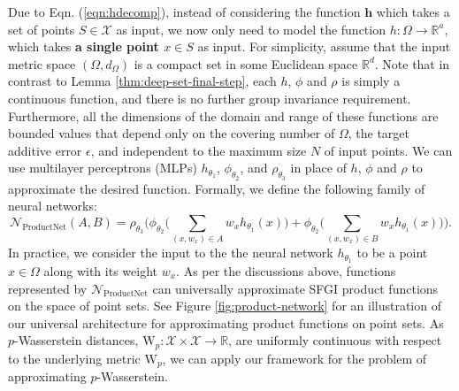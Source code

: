 \documentclass[12pt]{article}
\newcommand{\R}{\mathbb R}
\newcommand{\Network}{\mathcal{N}_{\mathrm{ProductNet}}}
\newcommand{\SFGI} {{SFGI}}
\begin{document}
Due to Eqn. (\ref{eqn:hdecomp}), instead of considering the function $\mathbf{h}$ which takes a set of points $S \in \mathcal{X}$ as input, we now only need to model the function $h: \Omega \to \R^a$, which takes {\bf a single point $x\in S$} as input. 
For simplicity, assume that the input metric space $(\Omega, d_\Omega)$ is a compact set in some Euclidean space $\R^d$. 
Note that in contrast to Lemma \ref{thm:deep-set-final-step}, each $h$, $\phi$ and $\rho$ is simply a continuous function, and there is no further group invariance requirement. 
Furthermore, all the dimensions of the domain and range of these functions are bounded values that depend only on the covering number of $\Omega$, the target additive error $\epsilon$, and independent to the maximum size $N$ of input points. 
We can use multilayer perceptrons (MLPs) $h_{\theta_1}$, $\phi_{\theta_2}$, and $\rho_{\theta_3}$ in place of $h$, $\phi$ and $\rho$ to approximate the desired function.
Formally, we define the following family of neural networks: 
\begin{equation}
\label{eq:network-definition}
    \Network(A, B) = \rho_{\theta_3} \Big( \phi_{\theta_2} \Big( \sum_{(x, w_x) \in A} w_xh_{\theta_1}(x)\Big) + \phi_{\theta_2} \Big( \sum_{(x, w_x) \in B} w_xh_{\theta_1}(x) \Big) \Big).
\end{equation}
In practice, we consider the input to the the neural network $h_{\theta_1}$ to be a point $x \in \Omega$ along with its weight $w_x$. As per the discussions above, functions represented by $\Network$ can universally approximate \SFGI{} product functions on the space of point sets.
See Figure \ref{fig:product-network} for an illustration of our universal architecture for approximating product functions on point sets. 
As $p$-Wasserstein distances, $\mathrm{W}_p: \mathcal{X} \times \mathcal{X} \to \R$, are uniformly continuous with respect to the underlying metric $\mathrm{W}_p$, we can apply our framework for the problem of approximating $p$-Wasserstein.
\end{document}
